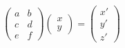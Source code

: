 \documentclass[preview]{standalone}
\begin{document}
\begin{align*}
\begin{pmatrix} a & b \\ c & d \\ e & f \end{pmatrix} \begin{pmatrix} x \\ y \end{pmatrix} = \begin{pmatrix} x' \\ y' \\ z' \end{pmatrix}
\end{align*}
\end{document}
